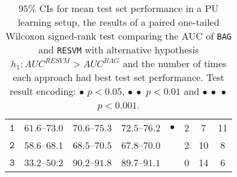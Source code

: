 \documentclass[preprint,elsarticle-num,12pt]{elsarticle}
\newcommand{\resvm}{RESVM}
\begin{document}
\begin{table}[!h]
\begin{tabular}{cccccccc}
$\texttt{1}$ & $61.6$--$73.0$ & $70.6$--$75.3$ & $72.5$--$76.2$ & $\bullet$ & 2 & 7 & 11\\ 
$\texttt{2}$ & $58.6$--$68.1$ & $68.5$--$70.5$ & $67.8$--$70.0$ &  & 2 & 10 & 8\\ 
$\texttt{3}$ & $33.2$--$50.2$ & $90.2$--$91.8$ & $89.7$--$91.1$ &  & 0 & 14 & 6\\ 
\bottomrule
\end{tabular}
\caption{$95\%$ CIs for mean test set performance in a PU learning setup, the results of a paired one-tailed Wilcoxon signed-rank test comparing the AUC of \texttt{BAG} and \texttt{\resvm} with alternative hypothesis $h_1: AUC^{\resvm} > AUC^{BAG}$ and the number of times each approach had best test set performance.
Test result encoding: $\bullet$ $p < 0.05$, $\bullet\ \bullet$ $p < 0.01$ and $\bullet\ \bullet\ \bullet$ $p < 0.001$.
}
\label{table:pulearning}
\end{table}
\end{document}
